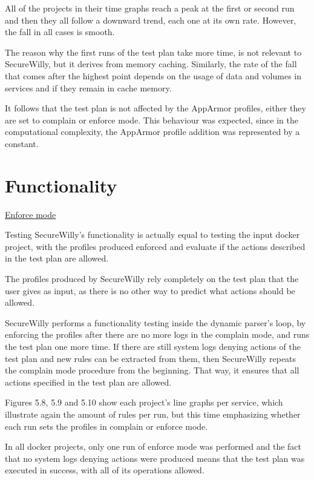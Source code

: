 All of the projects in their time graphs reach a peak at the first or second run and then they all follow a downward trend, each one at its own rate. However, the fall in all cases is smooth.

The reason why the first runs of the test plan take more time, is not relevant to SecureWilly, but it derives from memory caching. Similarly, the rate of the fall that comes after the highest point depends on the usage of data and volumes in services and if they remain in cache memory.

It follows that the test plan is not affected by the AppArmor profiles, either they are set to complain or enforce mode. This behaviour was expected, since in the computational complexity, the AppArmor profile addition was represented by a constant.

\section{Functionality}
\underline{Enforce mode}
\hfill\break

Testing SecureWilly's functionality is actually equal to testing the input docker project, with the profiles produced enforced and evaluate if the actions described in the test plan are allowed.

The profiles produced by SecureWilly rely completely on the test plan that the user gives as input, as there is no other way to predict what actions should be allowed.  

SecureWilly performs a functionality testing inside the dynamic parser's loop, by enforcing the profiles after there are no more logs in the complain mode, and runs the test plan one more time. If there are still system logs denying actions of the test plan and new rules can be extracted from them, then SecureWilly repeats the complain mode procedure from the beginning. That way, it ensures that all actions specified in the test plan are allowed.

Figures 5.8, 5.9 and 5.10 show each project's line graphs per service, which illustrate again the amount of rules per run, but this time emphasizing whether each run sets the profiles in complain or enforce mode.

In all docker projects, only one run of enforce mode was performed and the fact that no system logs denying actions were produced means that the test plan was executed in success, with all of its operations allowed.

\hfill\break

